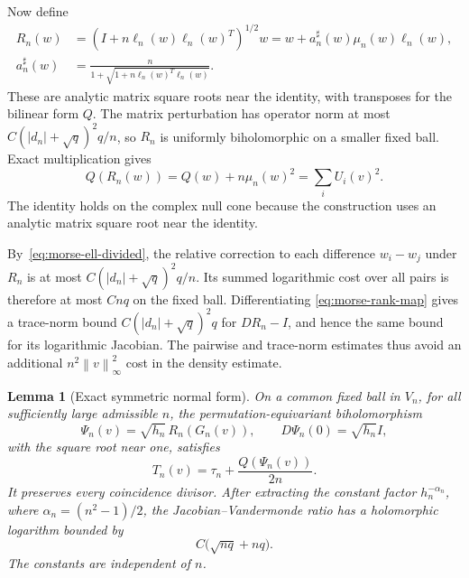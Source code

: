 \documentclass[11pt]{article}
\numberwithin{equation}{section}
\newtheorem{lemma}[theorem]{Lemma}
\theoremstyle{definition}
\newcommand{\norm}[1]{\left\lVert#1\right\rVert}
\begin{document}
Now define
\begin{align}
 R_n(w)&=\left(I+n\ell_n(w)\ell_n(w)^T\right)^{1/2}w
        =w+a_n^\sharp(w)\mu_n(w)\ell_n(w),\label{eq:morse-rank-map}\\
 a_n^\sharp(w)&=\frac n{1+\sqrt{1+n\ell_n(w)^T\ell_n(w)}}.
 \label{eq:morse-rank-coefficient}
\end{align}
These are analytic matrix square roots near the identity, with
transposes for the bilinear form $Q$. The matrix perturbation has
operator norm at most
$C(|d_n|+\sqrt q)^2q/n$, so $R_n$ is uniformly biholomorphic on a
smaller fixed ball.  Exact multiplication gives
\begin{equation}
 Q(R_n(w))=Q(w)+n\mu_n(w)^2=\sum_iU_i(v)^2.
 \label{eq:morse-rank-energy}
\end{equation}
The identity holds on the complex null cone because the construction
uses an analytic matrix square root near the identity.

By~\eqref{eq:morse-ell-divided}, the relative correction to each
difference $w_i-w_j$ under $R_n$ is at most
$C(|d_n|+\sqrt q)^2q/n$.  Its summed logarithmic cost over all pairs
is therefore at most $Cnq$ on the fixed ball.  Differentiating
\eqref{eq:morse-rank-map} gives a trace-norm bound
$C(|d_n|+\sqrt q)^2q$ for $DR_n-I$, and hence the same bound for its
logarithmic Jacobian.  The pairwise and trace-norm estimates thus avoid an additional
$n^2\norm v_\infty^2$ cost in the density estimate.

\begin{lemma}[Exact symmetric normal form]
\label{lem:negative-morse}
On a common fixed ball in $V_n$, for all sufficiently large admissible
$n$, the permutation-equivariant biholomorphism
\begin{equation}
 \Psi_n(v)=\sqrt{h_n}\,R_n(G_n(v)),
 \qquad D\Psi_n(0)=\sqrt{h_n}I,
 \label{eq:morse-final-map}
\end{equation}
with the square root near one, satisfies
\begin{equation}
 \boxed{T_n(v)=\tau_n+\frac{Q(\Psi_n(v))}{2n}.}
 \label{eq:morse-exact-normal-form}
\end{equation}
It preserves every coincidence divisor.  After extracting the constant
factor $h_n^{-\alpha_n}$, where $\alpha_n=(n^2-1)/2$, the
Jacobian--Vandermonde ratio has a holomorphic logarithm bounded by
\begin{equation}
 C\bigl(\sqrt{nq}+nq\bigr).
 \label{eq:morse-geometric-density}
\end{equation}
The constants are independent of $n$.
\end{lemma}
\end{document}
